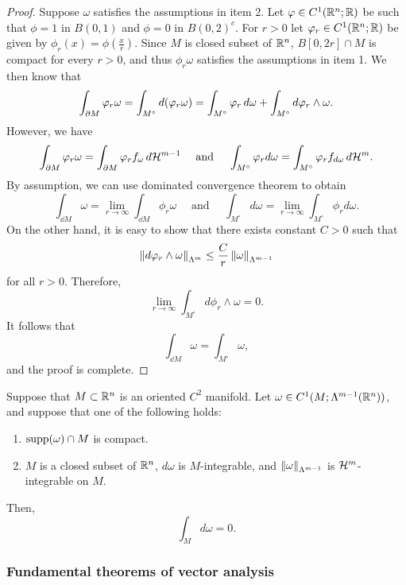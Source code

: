 \documentclass[a4paper]{article}
\begin{document}
\begin{proof}
  Suppose $\omega$ satisfies the assumptions in item 2. Let $\varphi \in C^1
  (\mathbb{R}^n ; \mathbb{R})$ be such that $\phi = 1$ in $B(0,1)$ and $\phi = 0$ in $B(0,
  2)^c$. For $r > 0$ let $\varphi_r \in C^1 (\mathbb{R}^n ; \mathbb{R})$ be given by $\phi_r
  (x) = \phi(\frac{x}{r})$. Since $M$ is closed subset of $\mathbb{R}^n$, $B[0,
  2r] \cap M$ is compact for every $r > 0$, and thus $\phi_r \omega$
  satisfies the assumptions in item 1. We then know that
  \[
    \int_{\partial M} \varphi_r \omega
    = \int_{M^\circ} d (\varphi_r \omega)
    = \int_{M^\circ} \varphi_r \, d \omega + \int_{M^\circ} d \varphi_r
    \wedge \omega.
  \]
  However, we have
  \[
    \int_{\partial M} \varphi_r \omega = \int_{\partial M} \varphi_r
    f_\omega \, d \mathcal{H}^{m-1}
    \quad \text{ and } \quad
    \int_{M^\circ} \varphi_r d \omega
    = \int_{M^\circ} \varphi_r f_{d \omega} \, d \mathcal{H}^m.
  \]
  By assumption, we can use dominated convergence theorem to obtain
  \[
    \int_{\dd M} \omega = \lim_{r \to \infty}
    \int_{\dd M} \phi_r \omega
    \quad \text{ and } \quad
    \int_{M^\circ} d \omega
    = \lim_{r \to \infty} \int_{M^\circ} \phi_r d \omega.
  \]
  On the other hand, it is easy to show that there exists constant $C > 0$
  such that
  \[
    \left\lVert d \varphi_r \wedge \omega\right\rVert_{\Lambda^m}
    \leq \frac{C}{r} \left\lVert \omega\right\rVert_{\Lambda^{m-1}}
  \]
  for all $r > 0$. Therefore,
  \[
    \lim_{r \to \infty} \int_{M^\circ} d \phi_r \wedge \omega
    = 0.
  \]
  It follows that
  \[
    \int_{\dd M} \omega = \int_{M^\circ} \omega,
  \]
  and the proof is complete.
\end{proof}

\begin{thm}
  Suppose that $M \subset \mathbb{R}^n$ is an oriented $C^2$ manifold.
  Let $\omega
    \in C^1 (M; \Lambda^{m-1} (\mathbb{R}^n))$, and suppose that one of
  the following holds:
  \begin{enumerate}
    \item $\operatorname{supp} (\omega) \cap M$ is compact.
    \item $M$ is a closed subset of $\mathbb{R}^n$,
          $d \omega$ is $M$-integrable,
          and $\left\lVert \omega\right\rVert_{\Lambda^{m-1}}$ is $\mathcal{H}^m$-integrable
          on $M$.
  \end{enumerate}
  Then,
  \[
    \int_M d \omega = 0.
  \]
\end{thm}

\subsubsection{Fundamental theorems of vector analysis}
\end{document}

